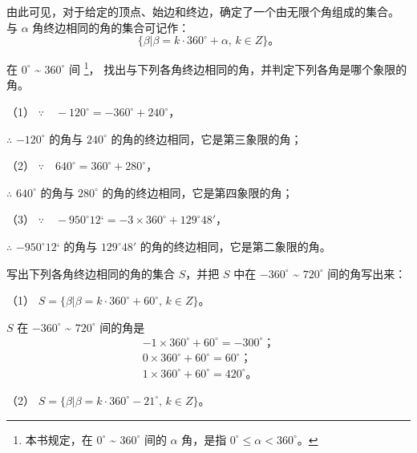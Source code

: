 由此可见，对于给定的顶点、始边和终边，确定了一个由无限个角组成的集合。
与 $\alpha$ 角终边相同的角的集合可记作：
$$\{ \beta | \beta = k \cdot 360^\circ + \alpha, \, k \in Z \} \text{。}$$

\liti 在 $0^\circ$ \~{} $360^\circ$ 间
\footnote{本书规定，在  $0^\circ$ \~{} $360^\circ$ 间的 $\alpha$ 角，是指 $0^\circ \leqslant \alpha < 360^\circ$。}，
找出与下列各角终边相同的角，并判定下列各角是哪个象限的角。
\begin{xiaoxiaotis}

        {}
        {}

\end{xiaoxiaotis}

\jie （1） $\because \quad -120^\circ = -360^\circ + 240^\circ$，

$\therefore$ $-120^\circ$ 的角与 $240^\circ$ 的角的终边相同，它是第三象限的角；

（2） $\because \quad 640^\circ = 360^\circ + 280^\circ$，

$\therefore$ $640^\circ$ 的角与 $280^\circ$ 的角的终边相同，它是第四象限的角；

（3） $\because \quad -950^\circ 12‘ = -3 \times 360^\circ + 129^\circ 48'$，

$\therefore$ $-950^\circ 12‘$ 的角与 $129^\circ 48'$ 的角的终边相同，它是第二象限的角。

\liti 写出下列各角终边相同的角的集合 $S$，并把 $S$ 中在 $-360^\circ$ \~{} $720^\circ$ 间的角写出来：
\begin{xiaoxiaotis} \setcounter{cntxiaoxiaoti}{0}

        {}
        {}

\end{xiaoxiaotis}

\jie （1） $S = \{ \beta | \beta = k \cdot 360^\circ + 60^\circ , \, k \in Z \}$。

$S$ 在 $-360^\circ$ \~{} $720^\circ$ 间的角是
\begin{gather*}
    -1 \times 360^\circ + 60^\circ = -300^\circ \text{；} \\
    0 \times 360^\circ + 60^\circ = 60^\circ \text{；} \\
    1 \times 360^\circ + 60^\circ = 420^\circ \text{。}
\end{gather*}

（2） $S = \{ \beta | \beta = k \cdot 360^\circ - 21^\circ , \, k \in Z \}$。

